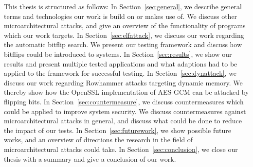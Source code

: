 This thesis is structured as follows:
In Section~\ref{sec:general}, we describe general terms and technologies our
work is build on or makes use of. We discuss other microarchitectural attacks,
and give an overview of the functionality of programs which our work targets.
In Section~\ref{sec:elfattack}, we discuss our work regarding the automatic
bitflip search. We present our testing framework and discuss how bitflips could
be introduced to systems.
In Section~\ref{sec:results}, we show our results and present multiple tested
applications and what adaptions had to be applied to the framework for
successful testing.
In Section~\ref{sec:dynattack}, we discuss our work regarding Rowhammer attacks
targeting dynamic memory. We thereby show how the OpenSSL implementation of
AES-GCM can be attacked by flipping bits.
In Section~\ref{sec:countermeasure}, we discuss countermeasures which could be
applied to improve system security. We discuss countermeasures against
microarchitectural attacks in general, and discuss what could be done to
reduce the impact of our tests.
In Section~\ref{sec:futurework}, we show possible future works, and an overview
of directions the research in the field of microarchitectural attacks could
take.
In Section~\ref{sec:conclusion}, we close our thesis with a summary and give a
conclusion of our work.

